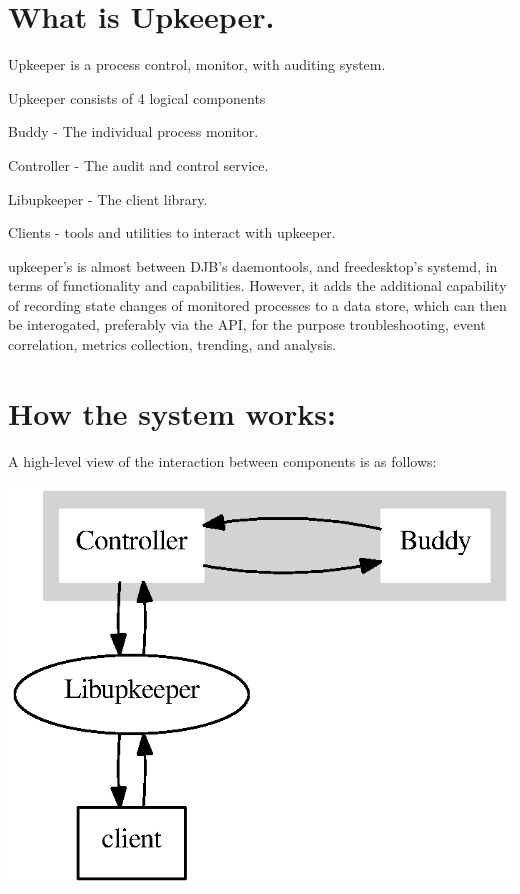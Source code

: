 \section{What is Upkeeper.}\label{index_whatis}
Upkeeper is a process control, monitor, with auditing system.

Upkeeper consists of 4 logical components
\begin{DoxyItemize}
\item Buddy -\/ The individual process monitor.
\item Controller -\/ The audit and control service.
\item Libupkeeper -\/ The client library.
\item Clients -\/ tools and utilities to interact with upkeeper.
\end{DoxyItemize}

upkeeper's is almost between DJB's daemontools, and freedesktop's systemd, in terms of functionality and capabilities. However, it adds the additional capability of recording state changes of monitored processes to a data store, which can then be interogated, preferably via the API, for the purpose troubleshooting, event correlation, metrics collection, trending, and analysis.\section{How the system works:}\label{index_howitworks}
A high-\/level view of the interaction between components is as follows:

\begin{center}

\begin{DoxyImageNoCaption}
  \mbox{\includegraphics[width=\textwidth]{dot_inline_dotgraph_1}}
\end{DoxyImageNoCaption}
\end{center}


